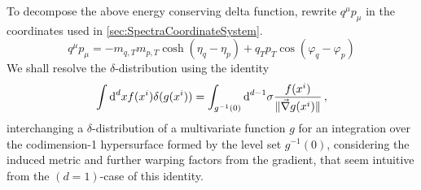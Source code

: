 To decompose the above energy conserving delta function, rewrite $q^\mu p_\mu$ in the coordinates used in \ref{sec:SpectraCoordinateSystem}.
\begin{equation}
    q^\mu p_\mu=-m_{q,T} m_{p,T}\cosh(\eta_q-\eta_p)+q_T p_T\cos(\varphi_q-\varphi_p)
\end{equation}
We shall resolve the $\delta$-distribution using the identity
\begin{equation}
    \int\text{d}^dx f(x^i)\delta(g(x^i))=\int_{g^{-1}(0)}\text{d}^{d-1}\sigma\frac{f(x^i)}{\Vert\vec{\nabla}g(x^i)\Vert}\,,
\end{equation}
interchanging a $\delta$-distribution of a multivariate function $g$ for an integration over the codimension-1 hypersurface formed by the level set ${g^{-1}(0)}$, considering the induced metric and further warping factors from the gradient, that seem intuitive from the ${(d=1)}$-case of this identity.


